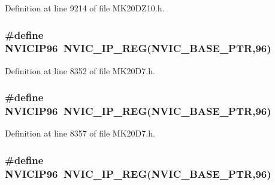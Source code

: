 Definition at line 9214 of file M\+K20\+D\+Z10.\+h.

\subsubsection[{\texorpdfstring{N\+V\+I\+C\+I\+P96}{NVICIP96}}]{\setlength{\rightskip}{0pt plus 5cm}\#define N\+V\+I\+C\+I\+P96~{\bf N\+V\+I\+C\+\_\+\+I\+P\+\_\+\+R\+EG}({\bf N\+V\+I\+C\+\_\+\+B\+A\+S\+E\+\_\+\+P\+TR},96)}\hypertarget{group___n_v_i_c___register___accessor___macros_ga1e824a58e29a7391568ea1727105b51e}{}\label{group___n_v_i_c___register___accessor___macros_ga1e824a58e29a7391568ea1727105b51e}


Definition at line 8352 of file M\+K20\+D7.\+h.

\subsubsection[{\texorpdfstring{N\+V\+I\+C\+I\+P96}{NVICIP96}}]{\setlength{\rightskip}{0pt plus 5cm}\#define N\+V\+I\+C\+I\+P96~{\bf N\+V\+I\+C\+\_\+\+I\+P\+\_\+\+R\+EG}({\bf N\+V\+I\+C\+\_\+\+B\+A\+S\+E\+\_\+\+P\+TR},96)}\hypertarget{group___n_v_i_c___register___accessor___macros_ga1e824a58e29a7391568ea1727105b51e}{}\label{group___n_v_i_c___register___accessor___macros_ga1e824a58e29a7391568ea1727105b51e}


Definition at line 8357 of file M\+K20\+D7.\+h.

\subsubsection[{\texorpdfstring{N\+V\+I\+C\+I\+P96}{NVICIP96}}]{\setlength{\rightskip}{0pt plus 5cm}\#define N\+V\+I\+C\+I\+P96~{\bf N\+V\+I\+C\+\_\+\+I\+P\+\_\+\+R\+EG}({\bf N\+V\+I\+C\+\_\+\+B\+A\+S\+E\+\_\+\+P\+TR},96)}\hypertarget{group___n_v_i_c___register___accessor___macros_ga1e824a58e29a7391568ea1727105b51e}{}\label{group___n_v_i_c___register___accessor___macros_ga1e824a58e29a7391568ea1727105b51e}


